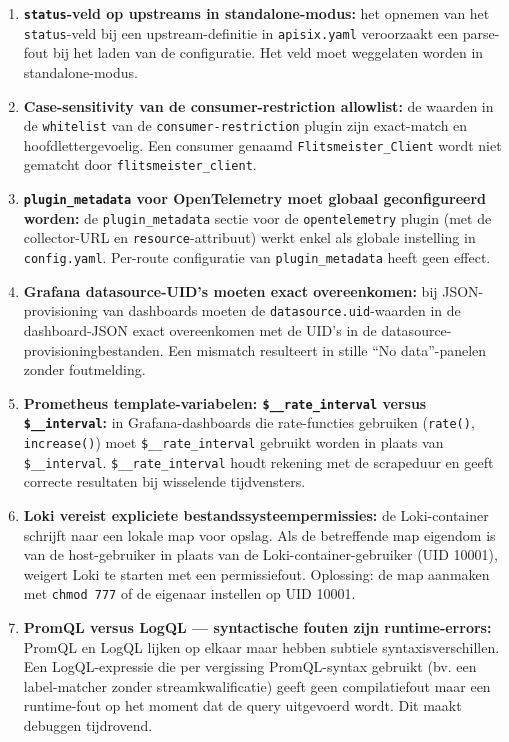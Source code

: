 \begin{enumerate}
  \item \textbf{\texttt{status}-veld op upstreams in standalone-modus:} het opnemen van het \texttt{status}-veld bij een upstream-definitie in \texttt{apisix.yaml} veroorzaakt een parse-fout bij het laden van de configuratie. Het veld moet weggelaten worden in standalone-modus.

  \item \textbf{Case-sensitivity van de consumer-restriction allowlist:} de waarden in de \texttt{whitelist} van de \texttt{consumer-restriction} plugin zijn exact-match en hoofdlettergevoelig. Een consumer genaamd \texttt{Flitsmeister\_Client} wordt niet gematcht door \texttt{flitsmeister\_client}.

  \item \textbf{\texttt{plugin\_metadata} voor OpenTelemetry moet globaal geconfigureerd worden:} de \texttt{plugin\_metadata} sectie voor de \texttt{opentelemetry} plugin (met de collector-URL en \texttt{resource}-attribuut) werkt enkel als globale instelling in \texttt{config.yaml}. Per-route configuratie van \texttt{plugin\_metadata} heeft geen effect.

  \item \textbf{Grafana datasource-UID's moeten exact overeenkomen:} bij JSON-provisioning van dashboards moeten de \texttt{datasource.uid}-waarden in de dashboard-JSON exact overeenkomen met de UID's in de datasource-provisioningbestanden. Een mismatch resulteert in stille ``No data''-panelen zonder foutmelding.

  \item \textbf{Prometheus template-variabelen: \texttt{\$\_\_rate\_interval} versus \texttt{\$\_\_interval}:} in Grafana-dashboards die rate-functies gebruiken (\texttt{rate()}, \texttt{increase()}) moet \texttt{\$\_\_rate\_interval} gebruikt worden in plaats van \texttt{\$\_\_interval}. \texttt{\$\_\_rate\_interval} houdt rekening met de scrapeduur en geeft correcte resultaten bij wisselende tijdvensters.

  \item \textbf{Loki vereist expliciete bestandssysteempermissies:} de Loki-container schrijft naar een lokale map voor opslag. Als de betreffende map eigendom is van de host-gebruiker in plaats van de Loki-container-gebruiker (UID 10001), weigert Loki te starten met een permissiefout. Oplossing: de map aanmaken met \texttt{chmod 777} of de eigenaar instellen op UID 10001.

  \item \textbf{PromQL versus LogQL --- syntactische fouten zijn runtime-errors:} PromQL en LogQL lijken op elkaar maar hebben subtiele syntaxisverschillen. Een LogQL-expressie die per vergissing PromQL-syntax gebruikt (bv. een label-matcher zonder streamkwalificatie) geeft geen compilatiefout maar een runtime-fout op het moment dat de query uitgevoerd wordt. Dit maakt debuggen tijdrovend.
\end{enumerate}

